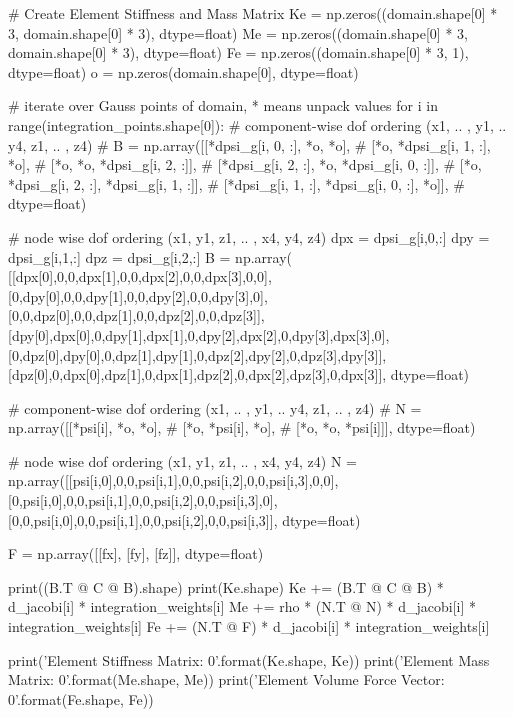 \begin{python}
    # Create Element Stiffness and Mass Matrix
    Ke = np.zeros((domain.shape[0] * 3, domain.shape[0] * 3), dtype=float)
    Me = np.zeros((domain.shape[0] * 3, domain.shape[0] * 3), dtype=float)
    Fe = np.zeros((domain.shape[0] * 3, 1), dtype=float)
    o = np.zeros(domain.shape[0], dtype=float)

    # iterate over Gauss points of domain, * means unpack values
    for i in range(integration_points.shape[0]):
        # component-wise dof ordering (x1, .. , y1, .. y4, z1, .. , z4)
        # B = np.array([[*dpsi_g[i, 0, :], *o, *o],
        #               [*o, *dpsi_g[i, 1, :], *o],
        #               [*o, *o, *dpsi_g[i, 2, :]],
        #               [*dpsi_g[i, 2, :], *o, *dpsi_g[i, 0, :]],
        #               [*o, *dpsi_g[i, 2, :], *dpsi_g[i, 1, :]],
        #               [*dpsi_g[i, 1, :], *dpsi_g[i, 0, :], *o]],
        #               dtype=float)

        # node wise dof ordering (x1, y1, z1, .. , x4, y4, z4)
        dpx = dpsi_g[i,0,:]
        dpy = dpsi_g[i,1,:]
        dpz = dpsi_g[i,2,:]
        B = np.array(
            [[dpx[0],0,0,dpx[1],0,0,dpx[2],0,0,dpx[3],0,0],
             [0,dpy[0],0,0,dpy[1],0,0,dpy[2],0,0,dpy[3],0],
             [0,0,dpz[0],0,0,dpz[1],0,0,dpz[2],0,0,dpz[3]],
             [dpy[0],dpx[0],0,dpy[1],dpx[1],0,dpy[2],dpx[2],0,dpy[3],dpx[3],0],
             [0,dpz[0],dpy[0],0,dpz[1],dpy[1],0,dpz[2],dpy[2],0,dpz[3],dpy[3]],
             [dpz[0],0,dpx[0],dpz[1],0,dpx[1],dpz[2],0,dpx[2],dpz[3],0,dpx[3]],
             dtype=float)

        # component-wise dof ordering (x1, .. , y1, .. y4, z1, .. , z4)
        # N = np.array([[*psi[i], *o, *o],
        #               [*o, *psi[i], *o],
        #               [*o, *o, *psi[i]]], dtype=float)

        # node wise dof ordering (x1, y1, z1, .. , x4, y4, z4)
        N = np.array([[psi[i,0],0,0,psi[i,1],0,0,psi[i,2],0,0,psi[i,3],0,0],
                      [0,psi[i,0],0,0,psi[i,1],0,0,psi[i,2],0,0,psi[i,3],0],
                      [0,0,psi[i,0],0,0,psi[i,1],0,0,psi[i,2],0,0,psi[i,3]],
                      dtype=float)

        F = np.array([[fx], [fy], [fz]], dtype=float)

        print((B.T @ C @ B).shape)
        print(Ke.shape)
        Ke += (B.T @ C @ B) * d_jacobi[i] * integration_weights[i]
        Me += rho * (N.T @ N) * d_jacobi[i] * integration_weights[i]
        Fe += (N.T @ F) * d_jacobi[i] * integration_weights[i]

    print('Element Stiffness Matrix: {0}'.format(Ke.shape, Ke))
    print('Element Mass Matrix: {0}'.format(Me.shape, Me))
    print('Element Volume Force Vector: {0}'.format(Fe.shape, Fe))
\end{python}


